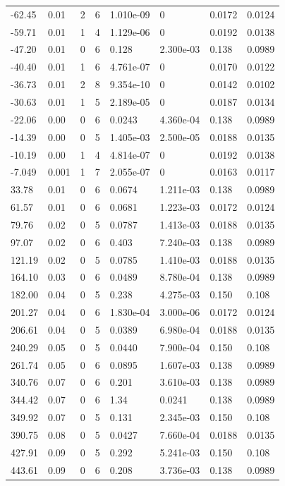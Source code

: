 \documentclass[preview]{standalone}
\begin{document}
{{\begin{tabular}{L{1.2cm}C{1.2cm} C{0.3cm}C{0.5cm} C{1.4cm}C{1.4cm} C{1.4cm}C{1.4cm}}
  -62.45  &  0.01  & 2     &  6 &  1.010e-09  & 0  & 0.0172 &  0.0124   \\ 
  -59.71  &  0.01  & 1     &  4 &  1.129e-06  & 0  & 0.0192 &  0.0138   \\ 
  -47.20  &  0.01  & 0     &  6 &  0.128  & 2.300e-03  & 0.138 &  0.0989   \\ 
  -40.40  &  0.01  & 1     &  6 &  4.761e-07  & 0  & 0.0170 &  0.0122   \\ 
  -36.73  &  0.01  & 2     &  8 &  9.354e-10  & 0  & 0.0142 &  0.0102   \\ 
  -30.63  &  0.01  & 1     &  5 &  2.189e-05  & 0  & 0.0187 &  0.0134   \\ 
  -22.06  &  0.00  & 0     &  6 &  0.0243  & 4.360e-04  & 0.138 &  0.0989   \\ 
  -14.39  &  0.00  & 0     &  5 &  1.405e-03  & 2.500e-05  & 0.0188 &  0.0135   \\ 
  -10.19  &  0.00  & 1     &  4 &  4.814e-07  & 0  & 0.0192 &  0.0138   \\ 
  -7.049  &  0.001  & 1     &  7 &  2.055e-07  & 0  & 0.0163 &  0.0117   \\ 
  33.78  &  0.01  & 0     &  6 &  0.0674  & 1.211e-03  & 0.138 &  0.0989   \\ 
  61.57  &  0.01  & 0     &  6 &  0.0681  & 1.223e-03  & 0.0172 &  0.0124   \\ 
  79.76  &  0.02  & 0     &  5 &  0.0787  & 1.413e-03  & 0.0188 &  0.0135   \\ 
  97.07  &  0.02  & 0     &  6 &  0.403  & 7.240e-03  & 0.138 &  0.0989   \\ 
  121.19  &  0.02  & 0     &  5 &  0.0785  & 1.410e-03  & 0.0188 &  0.0135   \\ 
  164.10  &  0.03  & 0     &  6 &  0.0489  & 8.780e-04  & 0.138 &  0.0989   \\ 
  182.00  &  0.04  & 0     &  5 &  0.238  & 4.275e-03  & 0.150 &  0.108   \\ 
  201.27  &  0.04  & 0     &  6 &  1.830e-04  & 3.000e-06  & 0.0172 &  0.0124   \\ 
  206.61  &  0.04  & 0     &  5 &  0.0389  & 6.980e-04  & 0.0188 &  0.0135   \\ 
  240.29  &  0.05  & 0     &  5 &  0.0440  & 7.900e-04  & 0.150 &  0.108   \\ 
  261.74  &  0.05  & 0     &  6 &  0.0895  & 1.607e-03  & 0.138 &  0.0989   \\ 
  340.76  &  0.07  & 0     &  6 &  0.201  & 3.610e-03  & 0.138 &  0.0989   \\ 
  344.42  &  0.07  & 0     &  6 &  1.34  & 0.0241  & 0.138 &  0.0989   \\ 
  349.92  &  0.07  & 0     &  5 &  0.131  & 2.345e-03  & 0.150 &  0.108   \\ 
  390.75  &  0.08  & 0     &  5 &  0.0427  & 7.660e-04  & 0.0188 &  0.0135   \\ 
  427.91  &  0.09  & 0     &  5 &  0.292  & 5.241e-03  & 0.150 &  0.108   \\ 
  443.61  &  0.09  & 0     &  6 &  0.208  & 3.736e-03  & 0.138 &  0.0989   \\ 
\hline 
\end{tabular} 

}}
\end{document}
